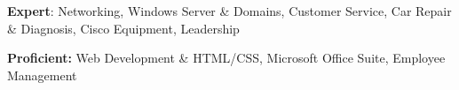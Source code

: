 \textbf{Expert}: Networking, Windows Server \& Domains, Customer Service, Car Repair \& Diagnosis, Cisco Equipment, Leadership

\textbf{Proficient:} Web Development \& HTML/CSS, Microsoft Office Suite, Employee Management
